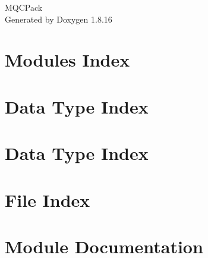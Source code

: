 \let\mypdfximage\pdfximage\def\pdfximage{\immediate\mypdfximage}\documentclass[twoside]{book}
\newcommand{\+}{\discretionary{\mbox{\scriptsize$\hookleftarrow$}}{}{}}
\newcommand{\clearemptydoublepage}{%
  \newpage{\pagestyle{empty}\cleardoublepage}%
}
\begin{document}
\hypersetup{pageanchor=false,
             bookmarksnumbered=true,
             pdfencoding=unicode
            }
\begin{titlepage}
\vspace*{7cm}
\begin{center}%
{\Large M\+Q\+C\+Pack }\\
\vspace*{1cm}
{\large Generated by Doxygen 1.8.16}\\
\end{center}
\end{titlepage}
\clearemptydoublepage
{}
\tableofcontents
\clearemptydoublepage
{}
\hypersetup{pageanchor=true}

\chapter{Modules Index}

\chapter{Data Type Index}

\chapter{Data Type Index}

\chapter{File Index}

\chapter{Module Documentation}


\end{document}
